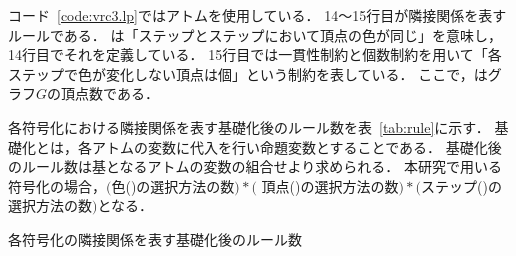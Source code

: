 コード~\ref{code:vrc3.lp}ではアトムを使用している．
14～15行目が隣接関係を表すルールである．
は「ステップとステップにおいて頂点の色が同じ」を意味し，
14行目でそれを定義している．
15行目では一貫性制約と個数制約を用いて「各ステップで色が変化しない頂点は個」という制約を表している．
ここで，はグラフ$G$の頂点数である．

各符号化における隣接関係を表す基礎化後のルール数を表~\ref{tab:rule}に示す．
基礎化とは，各アトムの変数に代入を行い命題変数とすることである．
基礎化後のルール数は基となるアトムの変数の組合せより求められる．
本研究で用いる符号化の場合，$($色()の選択方法の数$)*($
頂点()の選択方法の数$)*($ステップ()の選択方法の数$)$となる．

\begin{table}[tb]
  \centering
  \caption{各符号化の隣接関係を表す基礎化後のルール数}
  
  \label{tab:rule}
\end{table}

